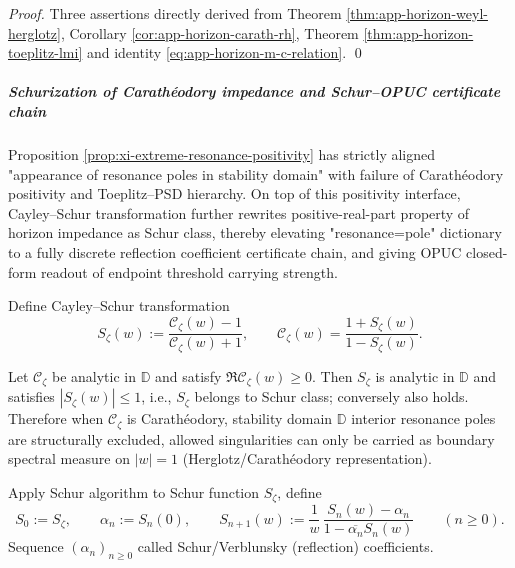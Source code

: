 \begin{proof}
Three assertions directly derived from Theorem \ref{thm:app-horizon-weyl-herglotz}, Corollary \ref{cor:app-horizon-carath-rh}, Theorem \ref{thm:app-horizon-toeplitz-lmi} and identity \eqref{eq:app-horizon-m-c-relation}. \qed
\end{proof}

\subparagraph{Schurization of Carathéodory impedance and Schur--OPUC certificate chain}
Proposition \ref{prop:xi-extreme-resonance-positivity} has strictly aligned "appearance of resonance poles in stability domain" with failure of Carathéodory positivity and Toeplitz--PSD hierarchy.
On top of this positivity interface, Cayley--Schur transformation further rewrites positive-real-part property of horizon impedance as Schur class, thereby elevating "resonance=pole" dictionary to a fully discrete reflection coefficient certificate chain, and giving OPUC closed-form readout of endpoint threshold carrying strength.
\par
Define Cayley--Schur transformation
\begin{equation}\label{eq:xi-horizon-cayley-schur}
\boxed{\;
S_{\zeta}(w):=\frac{\mathscr{C}_{\zeta}(w)-1}{\mathscr{C}_{\zeta}(w)+1},
\qquad
\mathscr{C}_{\zeta}(w)=\frac{1+S_{\zeta}(w)}{1-S_{\zeta}(w)}.\;}
\end{equation}

\begin{theorem}\label{thm:xi-horizon-carath-schur-equivalence}
Let \(\mathscr{C}_{\zeta}\) be analytic in \(\mathbb{D}\) and satisfy \(\Re \mathscr{C}_{\zeta}(w)\ge 0\).
Then \(S_{\zeta}\) is analytic in \(\mathbb{D}\) and satisfies \(|S_{\zeta}(w)|\le 1\), i.e., \(S_{\zeta}\) belongs to Schur class; conversely also holds.
Therefore when \(\mathscr{C}_{\zeta}\) is Carathéodory, stability domain \(\mathbb{D}\) interior resonance poles are structurally excluded, allowed singularities can only be carried as boundary spectral measure on \(|w|=1\) (Herglotz/Carathéodory representation).
\end{theorem}

\begin{definition}\label{def:xi-horizon-schur-parameters}
Apply Schur algorithm to Schur function \(S_{\zeta}\), define
\[
S_0:=S_{\zeta},\qquad \alpha_n:=S_n(0),\qquad
S_{n+1}(w):=\frac{1}{w}\,\frac{S_n(w)-\alpha_n}{1-\overline{\alpha_n}S_n(w)}\qquad(n\ge 0).
\]
Sequence \((\alpha_n)_{n\ge 0}\) called Schur/Verblunsky (reflection) coefficients.
\end{definition}

